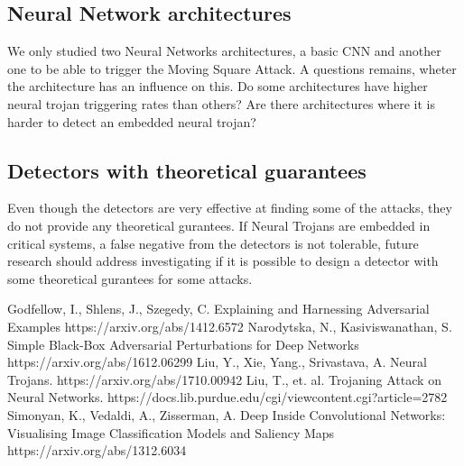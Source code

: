 \documentclass[letterpaper, 10 pt, conference]{ieeeconf}  %
\begin{document}
\subsection{Neural Network architectures}

We only studied two Neural Networks architectures, a basic CNN and another one
to be able to trigger the Moving Square Attack. A questions remains, wheter
the architecture has an influence on this. Do some architectures have higher
neural trojan triggering rates than others? Are there architectures where it
is harder to detect an embedded neural trojan?


\subsection{Detectors with theoretical guarantees}

Even though the detectors are very effective at finding some of the attacks,
they do not provide any theoretical gurantees. If Neural Trojans are embedded
in critical systems, a false negative from the detectors is not tolerable,
future research should address investigating if it is possible to design a
detector with some theoretical gurantees for some attacks.


\begin{thebibliography}{99}

 Godfellow, I., Shlens, J., Szegedy, C. Explaining and Harnessing Adversarial Examples https://arxiv.org/abs/1412.6572
 Narodytska, N., Kasiviswanathan, S. Simple Black-Box Adversarial Perturbations for Deep Networks https://arxiv.org/abs/1612.06299
 Liu, Y., Xie, Yang., Srivastava, A. Neural Trojans. https://arxiv.org/abs/1710.00942
 Liu, T., et. al. Trojaning Attack on Neural Networks. https://docs.lib.purdue.edu/cgi/viewcontent.cgi?article=2782 
 Simonyan, K., Vedaldi, A., Zisserman, A. Deep Inside Convolutional Networks: Visualising Image Classification Models and Saliency Maps https://arxiv.org/abs/1312.6034






\end{thebibliography}
\end{document}

